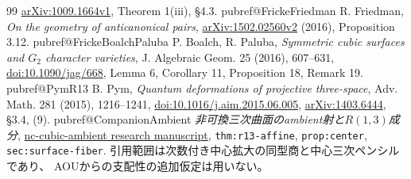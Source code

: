 \begin{thebibliography}{99}
\href{https://arxiv.org/abs/1009.1664v1}{arXiv:1009.1664v1},
Theorem 1(iii), \S4.3.
\fi
\ifcsname pubref@FrickeFriedman\endcsname
{}
R. Friedman, \emph{On the geometry of anticanonical pairs},
\href{https://arxiv.org/abs/1502.02560v2}{arXiv:1502.02560v2} (2016),
Proposition 3.12.
\fi
\ifcsname pubref@FrickeBoalchPaluba\endcsname
{}
P. Boalch, R. Paluba, \emph{Symmetric cubic surfaces and $G_2$ character varieties},
J. Algebraic Geom. 25 (2016), 607--631,
\href{https://doi.org/10.1090/jag/668}{doi:10.1090/jag/668},
Lemma 6, Corollary 11, Proposition 18, Remark 19.
\fi
\ifcsname pubref@PymR13\endcsname
{} B. Pym,
\emph{Quantum deformations of projective three-space},
Adv. Math. 281 (2015), 1216--1241,
\href{https://doi.org/10.1016/j.aim.2015.06.005}{doi:10.1016/j.aim.2015.06.005},
\href{https://arxiv.org/abs/1403.6444}{arXiv:1403.6444}, \S3.4, (9).
\fi
\ifcsname pubref@CompanionAmbient\endcsname
{}
\emph{非可換三次曲面のambient射と$R(1,3)$成分},
\href{https://github.com/uedakazushi/nc-cubic-ambient/blob/main/papers/nc-cubic-ambient.tex}
{nc-cubic-ambient research manuscript},
\texttt{thm:r13-affine}, \texttt{prop:center}, \texttt{sec:surface-fiber}.
引用範囲は次数付き中心拡大の同型商と中心三次ペンシルであり、
AOUからの支配性の追加仮定は用いない。
\fi
\end{thebibliography}
